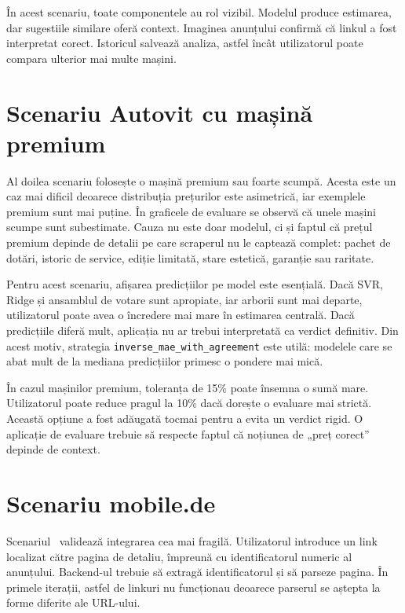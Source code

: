În acest scenariu, toate componentele au rol vizibil. Modelul produce estimarea, dar sugestiile similare oferă context. Imaginea anunțului confirmă că linkul a fost interpretat corect. Istoricul salvează analiza, astfel încât utilizatorul poate compara ulterior mai multe mașini.

\section{Scenariu Autovit cu mașină premium}
\label{sec:case-autovit-premium}

Al doilea scenariu folosește o mașină premium sau foarte scumpă. Acesta este un caz mai dificil deoarece distribuția prețurilor este asimetrică, iar exemplele premium sunt mai puține. În graficele de evaluare se observă că unele mașini scumpe sunt subestimate. Cauza nu este doar modelul, ci și faptul că prețul premium depinde de detalii pe care scraperul nu le captează complet: pachet de dotări, istoric de service, ediție limitată, stare estetică, garanție sau raritate.

Pentru acest scenariu, afișarea predicțiilor pe model este esențială. Dacă SVR, Ridge și ansamblul de votare sunt apropiate, iar arborii sunt mai departe, utilizatorul poate avea o încredere mai mare în estimarea centrală. Dacă predicțiile diferă mult, aplicația nu ar trebui interpretată ca verdict definitiv. Din acest motiv, strategia \texttt{inverse\_mae\_with\_agreement} este utilă: modelele care se abat mult de la mediana predicțiilor primesc o pondere mai mică.

În cazul mașinilor premium, toleranța de 15\% poate însemna o sumă mare. Utilizatorul poate reduce pragul la 10\% dacă dorește o evaluare mai strictă. Această opțiune a fost adăugată tocmai pentru a evita un verdict rigid. O aplicație de evaluare trebuie să respecte faptul că noțiunea de „preț corect” depinde de context.

\section{Scenariu mobile.de}
\label{sec:case-mobilede}

Scenariul \mobilede\ validează integrarea cea mai fragilă. Utilizatorul introduce un link localizat către pagina de detaliu, împreună cu identificatorul numeric al anunțului. Backend-ul trebuie să extragă identificatorul și să parseze pagina. În primele iterații, astfel de linkuri nu funcționau deoarece parserul se aștepta la forme diferite ale URL-ului.


